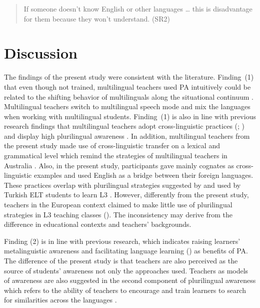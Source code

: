 \documentclass[output=paper]{../langscibook}
\begin{document}
\begin{quote}
If someone doesn’t know English or other languages … this is disadvantage for them because they won’t understand. (SR2)
\end{quote}


\section{Discussion}
The findings of the present study were consistent with the literature. Finding~(1) that even though not trained, multilingual teachers used PA intuitively could be related to the shifting behavior of multilinguals along the situational continuum \citep{Grosjean2008}. Multilingual teachers switch to multilingual speech mode and mix the languages when working with multilingual students.  Finding~(1) is also in line with previous research findings that multilingual teachers adopt cross-linguistic practices (\citealt{Ellis2004,Ellis2013}; \citealt{HigginsPonte2017}) and display high plurilingual awareness \citep{Otwinowska2014}. In addition, multilingual teachers from the present study made use of cross-linguistic transfer on a lexical and grammatical level which remind the strategies of multilingual teachers in Australia \citep{Ellis2004}. Also, in the present study, participants gave mainly cognates as cross-linguistic examples and used English as a bridge between their foreign languages. These practices overlap with plurilingual strategies suggested by \citet{Otwinowska2014} and used by Turkish ELT students to learn L3 \citep{Korkmaz2013}. However, differently from the present study, teachers in the European context claimed to make little use of plurilingual strategies in L3 teaching classes (\citealt{GöbelVieluf2014}). The inconsistency may derive from the difference in educational contexts and teachers’ backgrounds.

Finding (2) is in line with previous research, which indicates raising learners’ metalinguistic awareness \citep{JessnerEtAl2016} and facilitating language learning (\citealt{BonoStratilaki2009}) as benefits of PA. The difference of the present study is that teachers are also perceived as the source of students’ awareness not only the approaches used. Teachers as models of awareness are also suggested in the second component of plurilingual awareness which refers to the ability of teachers to encourage and train learners to search for similarities across the languages \citep{Otwinowska2014}.
\end{document}
